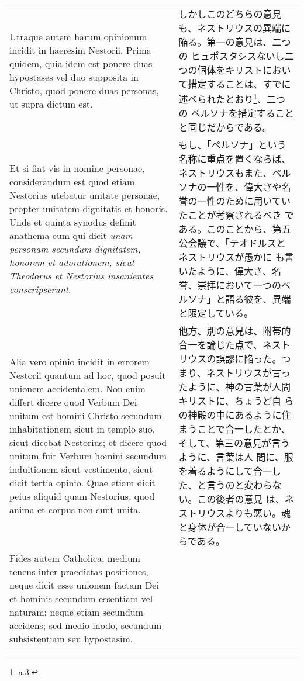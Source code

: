 \documentclass[10pt]{jsarticle} %
\begin{document}
\begin{longtable}{p{21em}p{21em}}
\\

Utraque autem harum opinionum
incidit in haeresim Nestorii. Prima quidem, quia idem est ponere duas
hypostases vel duo supposita in Christo, quod ponere duas personas, ut
supra dictum est. 

&

しかしこのどちらの意見も、ネストリウスの異端に陥る。第一の意見は、二つの
 ヒュポスタシスないし二つの個体をキリストにおいて措定することは、すでに
 述べられたとおり\footnote{a.3.}、二つの
 ペルソナを措定することと同じだからである。

\\

Et si fiat vis in nomine personae, considerandum est
quod etiam Nestorius utebatur unitate personae, propter unitatem
dignitatis et honoris. Unde et quinta synodus definit anathema eum qui
dicit {\itshape unam personam secundum dignitatem, honorem et adorationem, sicut
Theodorus et Nestorius insanientes conscripserunt}. 


&

もし、「ペルソナ」という名称に重点を置くならば、ネストリウスもまた、ペル
 ソナの一性を、偉大さや名誉の一性のために用いていたことが考察されるべき
 である。このことから、第五公会議で、「テオドルスとネストリウスが愚かに
 も書いたように、偉大さ、名誉、崇拝において一つのペルソナ」と語る彼を、異端と限定している。


\\

Alia vero opinio
incidit in errorem Nestorii quantum ad hoc, quod posuit unionem
accidentalem. Non enim differt dicere quod Verbum Dei unitum est homini
Christo secundum inhabitationem sicut in templo suo, sicut dicebat
Nestorius; et dicere quod unitum fuit Verbum homini secundum induitionem
sicut vestimento, sicut dicit tertia opinio. 
Quae etiam dicit peius
aliquid quam Nestorius, quod anima et corpus non sunt unita. 

&

他方、別の意見は、附帯的合一を論じた点で、ネストリウスの誤謬に陥った。つ
 まり、ネストリウスが言ったように、神の言葉が人間キリストに、ちょうど自
 らの神殿の中にあるように住まうことで合一したとか、そして、第三の意見が言うように、言葉は人
 間に、服を着るようにして合一した、と言うのと変わらない。この後者の意見
 は、ネストリウスよりも悪い。魂と身体が合一していないからである。


\\

Fides autem
Catholica, medium tenens inter praedictas positiones, neque dicit esse
unionem factam Dei et hominis secundum essentiam vel naturam; neque
etiam secundum accidens; sed medio modo, secundum subsistentiam seu
hypostasim. 


\end{longtable}
\end{document}
